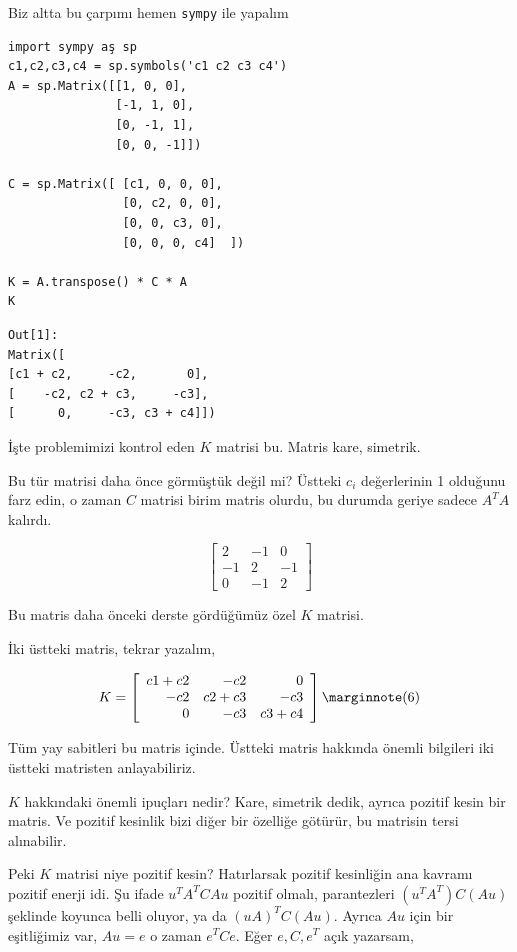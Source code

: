 \documentclass[12pt,fleqn]{article}\usepackage{../../common}
\begin{document}
Biz altta bu çarpımı hemen \verb!sympy! ile yapalım
  
\begin{verbatim}
import sympy aş sp
c1,c2,c3,c4 = sp.symbols('c1 c2 c3 c4')
A = sp.Matrix([[1, 0, 0],
               [-1, 1, 0],
               [0, -1, 1],
               [0, 0, -1]])

C = sp.Matrix([ [c1, 0, 0, 0],
                [0, c2, 0, 0],
                [0, 0, c3, 0],
                [0, 0, 0, c4]  ])

K = A.transpose() * C * A
K
\end{verbatim}

\begin{verbatim}
Out[1]: 
Matrix([
[c1 + c2,     -c2,       0],
[    -c2, c2 + c3,     -c3],
[      0,     -c3, c3 + c4]])
\end{verbatim}

İşte problemimizi kontrol eden $K$ matrisi bu. Matris kare, simetrik.

Bu tür matrisi daha önce görmüştük değil mi? Üstteki $c_i$ değerlerinin 1
olduğunu farz edin, o zaman $C$ matrisi birim matris olurdu, bu durumda
geriye sadece $A^T A$ kalırdı.

$$
\left[\begin{array}{rrr}
2 & -1 & 0 \\ -1 & 2 & -1 \\ 0 & -1 & 2
\end{array}\right]
$$

Bu matris daha önceki derste gördüğümüz özel $K$ matrisi. 

İki üstteki matris, tekrar yazalım,

$$ K = 
\left[\begin{array}{rrr}
c1 + c2   &     -c2 &       0 \\
-c2       & c2 + c3 &     -c3 \\
0         & -c3     &      c3 + c4
\end{array}\right]
\mlabel{6}
$$

Tüm yay sabitleri bu matris içinde. Üstteki matris hakkında önemli bilgileri
iki üstteki matristen anlayabiliriz. 

$K$ hakkındaki önemli ipuçları nedir? Kare, simetrik dedik, ayrıca pozitif kesin
bir matris. Ve pozitif kesinlik bizi diğer bir özelliğe götürür, bu matrisin
tersi alınabilir.

Peki $K$ matrisi niye pozitif kesin? Hatırlarsak pozitif kesinliğin ana kavramı
pozitif enerji idi. Şu ifade $u^T A^T C A u$ pozitif olmalı, parantezleri 
$(u^T A^T) C (A u)$ şeklinde koyunca belli oluyor, ya da $(u A)^T C (A u)$. 
Ayrıca $Au$ için bir eşitliğimiz var, $Au = e$ o zaman $e^T C e$. Eğer $e,C,e^T$
açık yazarsam,
\end{document}
